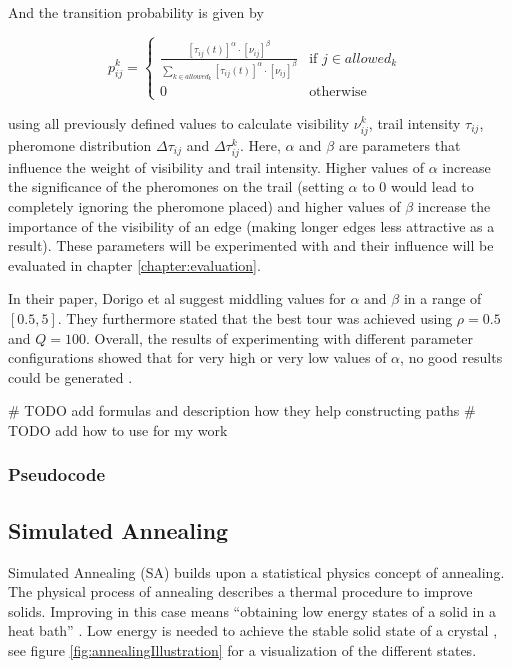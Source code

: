 And the transition probability is given by

\begin{equation}\label{eq:transitionProbability}
	p_{ij}^k = \begin{cases}
		\frac{[\tau_{ij}(t)]^{\alpha} \cdot [\nu_{ij}]^{\beta}}{\sum_{k \in allowed_k} [\tau_{ij}(t)]^{\alpha} \cdot [\nu_{ij}]^{\beta}} &\text{if $j \in allowed_k$ }\\
		0 &\text{otherwise}
	\end{cases}
\end{equation}

using all previously defined values to calculate visibility $\nu_{ij}^k$, trail intensity $\tau_{ij}$, pheromone distribution $\Delta\tau_{ij}$ and $\Delta\tau_{ij}^k$.
Here, $\alpha$ and $\beta$ are parameters that influence the weight of visibility and trail intensity.
Higher values of $\alpha$ increase the significance of the pheromones on the trail (setting $\alpha$ to 0 would lead to completely ignoring the pheromone placed) and higher values of $\beta$ increase the importance of the visibility of an edge (making longer edges less attractive as a result)\cite{dorigo_ant_1996}.
These parameters will be experimented with and their influence will be evaluated in chapter \ref{chapter:evaluation}.

In their paper, Dorigo et al suggest middling values for $\alpha$ and $\beta$ in a range of $[0.5,5]$.
They furthermore stated that the best tour was achieved using $\rho = 0.5$ and $Q=100$.
Overall, the results of experimenting with different parameter configurations showed that for very high or very low values of $\alpha$, no good results could be generated \cite{dorigo_ant_1996}.



\# TODO add formulas and description how they help constructing paths
\# TODO add how to use for my work


\subsubsection{Pseudocode}
\label{subsubsec:antPseudocode}

\subsection{Simulated Annealing}
\label{subsec:simulatedAnnealingBackground}

Simulated Annealing (SA) builds upon a statistical physics concept of annealing.
The physical process of annealing describes a thermal procedure to improve solids.
Improving in this case means \enquote{obtaining low energy states of a solid in a heat bath} \cite{aarts_simulated_2005}.
Low energy is needed to achieve the stable solid state of a crystal \cite{delahaye_simulated_2019}, see figure \ref{fig:annealingIllustration} for a visualization of the different states.

